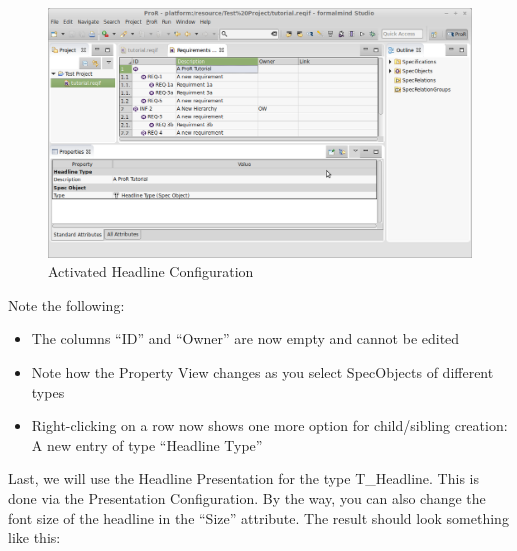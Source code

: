 \begin{figure}[H]
\centering      
\includegraphics[width=\linewidth]{../rmf-images/desc_headline.png}      
\caption{Activated Headline Configuration}      
\label{fig:activeHeadlineConfig}
\end{figure}

Note the following:

\begin{itemize}
\item
  The columns ``ID'' and ``Owner'' are now empty and cannot be edited
\item
  Note how the Property View changes as you select SpecObjects of different types
\item
  Right-clicking on a row now shows one more option for child/sibling creation: A new entry of type ``Headline Type''
\end{itemize}

Last, we will use the Headline Presentation for the type T\_Headline.  This is done via the Presentation Configuration.  By the way, you can also change the font size of the headline in the ``Size'' attribute.  The result should look something like this:

